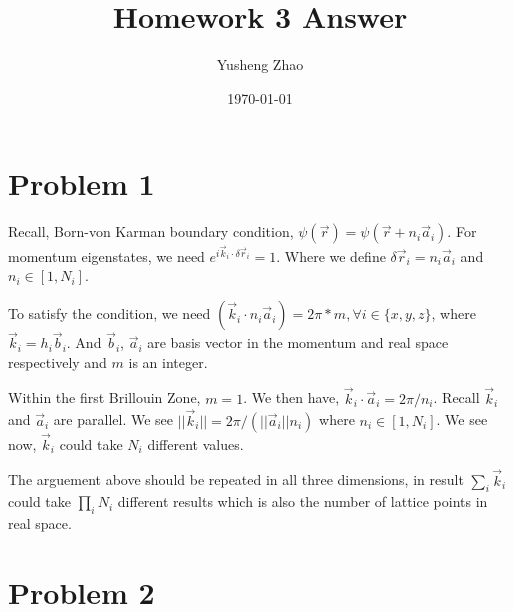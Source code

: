 \documentclass[11pt]{article}
\author{Yusheng Zhao}
\date{\today}
\title{Homework 3 Answer}
\begin{document}
\maketitle


\section{Problem 1}
\label{sec:org0f74807}
Recall, Born-von Karman boundary condition, \(\psi(\vec{r}) =
\psi(\vec{r}+n_{i}\vec{a}_{i})\). For momentum eigenstates, we need \(e^{i
\vec{k}_{i}\cdot \delta \vec{r}_{i}} = 1\). Where we define \(\delta \vec{r}_{i}
= n_{i} \vec{a}_{i}\) and \(n_{i} \in [1,N_{i}]\).

To satisfy the condition, we need \((\vec{k}_{i} \cdot n_{i} \vec{a}_{i} ) =
2\pi * m, \forall i \in \{x,y,z\}\), where \(\vec{k}_{i} = h_{i} \vec{b}_{i}\). And
\(\vec{b}_{i}\), \(\vec{a}_{i}\) are basis vector in the momentum and real space
respectively and \(m\) is an integer.

Within the first Brillouin Zone, \(m=1\). We then have, \(\vec{k}_{i} \cdot
\vec{a}_{i} = 2\pi /n_{i}\). Recall \(\vec{k}_{i}\) and \(\vec{a}_{i}\) are
parallel. We see \(||\vec{k}_{i}|| = 2\pi /(||\vec{a}_{i}||n_{i})\) where \(n_{i}
\in [1,N_{i}]\). We see now, \(\vec{k}_{i}\) could take \(N_{i}\) different values.

The arguement above should be repeated in all three dimensions, in result
\(\sum_{i} \vec{k}_{i}\) could take \(\prod_{i}N_{i}\) different results which is
also the number of lattice points in real space.

\section{Problem 2}
\label{sec:org5f4733b}
\end{document}
